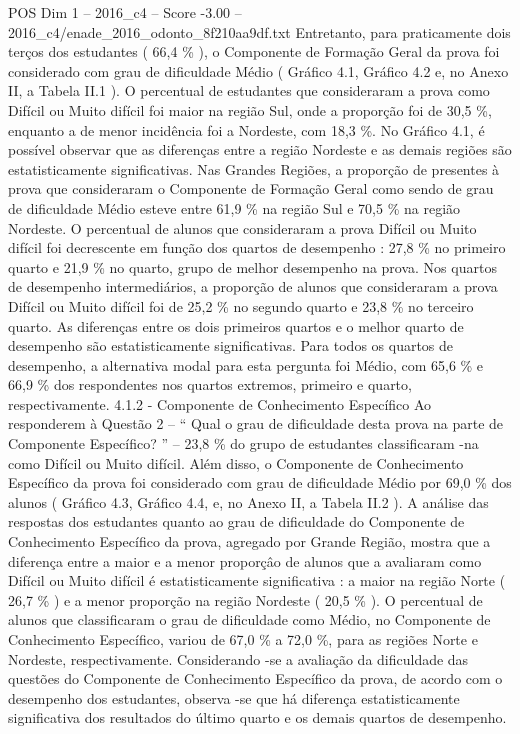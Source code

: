 \begin{textsample}{POS Dim 1 – 2016\_c4 – Score -3.00 – 2016\_c4/enade\_2016\_odonto\_8f210aa9df.txt}
Entretanto, para praticamente dois terços dos estudantes ( 66,4 \% ), o Componente de Formação Geral da prova foi considerado com grau de dificuldade Médio ( Gráfico 4.1, Gráfico 4.2 e, no Anexo II, a Tabela II.1 ).
O percentual de estudantes que consideraram a prova como Difícil ou Muito difícil foi maior na região Sul, onde a proporção foi de 30,5 \%, enquanto a de menor incidência foi a Nordeste, com 18,3 \%.
No Gráfico 4.1, é possível observar que as diferenças entre a região Nordeste e as demais regiões são estatisticamente significativas.
Nas Grandes Regiões, a proporção de presentes à prova que consideraram o Componente de Formação Geral como sendo de grau de dificuldade Médio esteve entre 61,9 \% na região Sul e 70,5 \% na região Nordeste.
O percentual de alunos que consideraram a prova Difícil ou Muito difícil foi decrescente em função dos quartos de desempenho : 27,8 \% no primeiro quarto e 21,9 \% no quarto, grupo de melhor desempenho na prova.
Nos quartos de desempenho intermediários, a proporção de alunos que consideraram a prova Difícil ou Muito difícil foi de 25,2 \% no segundo quarto e 23,8 \% no terceiro quarto.
As diferenças entre os dois primeiros quartos e o melhor quarto de desempenho são estatisticamente significativas.
Para todos os quartos de desempenho, a alternativa modal para esta pergunta foi Médio, com 65,6 \% e 66,9 \% dos respondentes nos quartos extremos, primeiro e quarto, respectivamente. 4.1.2 - Componente de Conhecimento Específico Ao responderem à Questão 2 – “ Qual o grau de dificuldade desta prova na parte de Componente Específico? ” – 23,8 \% do grupo de estudantes classificaram -na como Difícil ou Muito difícil.
Além disso, o Componente de Conhecimento Específico da prova foi considerado com grau de dificuldade Médio por 69,0 \% dos alunos ( Gráfico 4.3, Gráfico 4.4, e, no Anexo II, a Tabela II.2 ).
A análise das respostas dos estudantes quanto ao grau de dificuldade do Componente de Conhecimento Específico da prova, agregado por Grande Região, mostra que a diferença entre a maior e a menor proporçâo de alunos que a avaliaram como Difícil ou Muito difícil é estatisticamente significativa : a maior na região Norte ( 26,7 \% ) e a menor proporção na região Nordeste ( 20,5 \% ).
O percentual de alunos que classificaram o grau de dificuldade como Médio, no Componente de Conhecimento Específico, variou de 67,0 \% a 72,0 \%, para as regiões Norte e Nordeste, respectivamente.
Considerando -se a avaliação da dificuldade das questões do Componente de Conhecimento Específico da prova, de acordo com o desempenho dos estudantes, observa -se que há diferença estatisticamente significativa dos resultados do último quarto e os demais quartos de desempenho.

\end{textsample}
